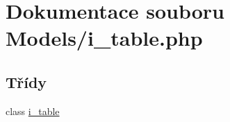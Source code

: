 \hypertarget{i__table_8php}{\section{Dokumentace souboru Models/i\-\_\-table.php}
\label{i__table_8php}
}
\subsection*{Třídy}
\begin{DoxyCompactItemize}
\item 
class \hyperlink{classi__table}{i\-\_\-table}
\end{DoxyCompactItemize}

